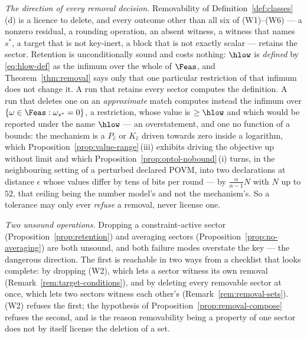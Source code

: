 
\begin{remark}\label{rem:classes}
\emph{The direction of every removal decision.} Removability of
Definition~\ref{def:classes}\,(d) is a licence to delete, and every outcome
other than all six of (W1)--(W6) --- a nonzero residual, a rounding
operation, an absent witness, a witness that names $s^{*}$, a target that
is not key-inert, a block that is not exactly scalar --- retains the
sector. Retention is unconditionally sound and costs nothing: $\hlow$ is
\emph{defined} by \eqref{eq:hlow-def} as the infimum over the whole of
$\Feas$, and Theorem~\ref{thm:removal} says only that one particular
restriction of that infimum does not change it. A run that retains every
sector computes the definition. A run that deletes one on an
\emph{approximate} match computes instead the infimum over
$\{\omega\in\Feas:\omega_{s^{*}}=0\}$, a restriction, whose value is
$\ge\hlow$ and which would be reported under the name $\hlow$ --- an
overstatement, and one no function of a  bounds:
the mechanism is a $P_{\hat c}$ or $K_{\hat c}$ driven towards zero inside a
logarithm, which Proposition~\ref{prop:value-range}\,(iii) exhibits driving
the objective up without limit and which
Proposition~\ref{prop:optol-nobound}\,(i) turns, in the neighbouring
setting of a perturbed declared POVM, into two declarations at distance
$\epsilon$ whose values differ by tens of bits per round --- by
$\frac{\alpha}{\alpha-1}N$ with $N$ up to $52$, that ceiling being the
number model's and not the mechanism's. So a tolerance may only ever
\emph{refuse} a removal, never license one.

\emph{Two unsound operations.} Dropping a constraint-active sector
(Proposition~\ref{prop:retention}) and averaging sectors
(Proposition~\ref{prop:no-averaging}) are both unsound, and both failure
modes overstate the key --- the dangerous direction. The first is reachable
in two ways from a checklist that looks complete: by dropping (W2), which
lets a sector witness its own removal (Remark~\ref{rem:target-conditions}),
and by deleting every removable sector at once, which lets two sectors
witness each other's (Remark~\ref{rem:removal-sets}). (W2) refuses the
first; the hypothesis of Proposition~\ref{prop:removal-compose} refuses the
second, and is the reason removability being a property of one sector does
not by itself license the deletion of a set.
\end{remark}
